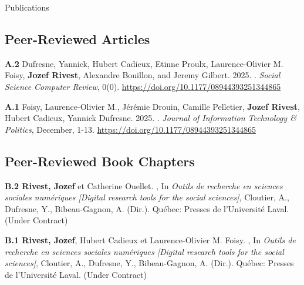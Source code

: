 \documentclass{resume} %
\begin{document}
\begin{rSection}{Publications}

\subsection*{Peer-Reviewed Articles}

{\textbf{A.2} Dufresne, Yannick, Hubert Cadieux, Etinne Proulx, Laurence-Olivier M. Foisy, \textbf{Jozef Rivest}, Alexandre Bouillon, and Jeremy Gilbert. 2025. . \textit{Social Science Computer Review}, 0(0). \href{https://doi.org/10.1177/08944393251344865}{https://doi.org/10.1177/08944393251344865}}

{\textbf{A.1} Foisy, Laurence-Olivier M., Jérémie Drouin, Camille Pelletier, \textbf{Jozef Rivest}, Hubert Cadieux, Yannick Dufresne. 2025. . \textit{Journal of Information Technology \& Politics}, December, 1-13. \href{https://doi.org/10.1177/08944393251344865}{https://doi.org/10.1177/08944393251344865}}

\subsection*{Peer-Reviewed Book Chapters}

{\textbf{B.2 Rivest, Jozef} et Catherine Ouellet. , In \textit{Outils de recherche en sciences sociales numériques [Digital research tools for the social sciences]}, Cloutier, A., Dufresne, Y., Bibeau-Gagnon, A. (Dir.). Québec: Presses de l'Université Laval. (Under Contract)} \par

{\textbf{B.1 Rivest, Jozef}, Hubert Cadieux et Laurence-Olivier M. Foisy. , In \textit{Outils de recherche en sciences sociales numériques [Digital research tools for the social sciences]}, Cloutier, A., Dufresne, Y., Bibeau-Gagnon, A. (Dir.). Québec: Presses de l'Université Laval.} (Under Contract) \par


\end{rSection}
\end{document}
